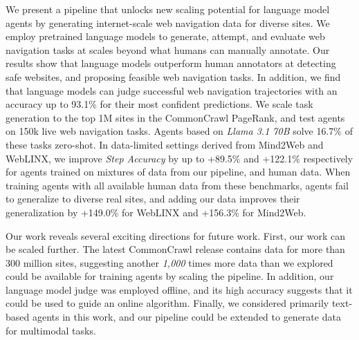 We present a pipeline that unlocks new scaling potential for language model agents by generating internet-scale web navigation data for diverse sites. We employ pretrained language models to generate, attempt, and evaluate web navigation tasks at scales beyond what humans can manually annotate. Our results show that language models outperform human annotators at detecting safe websites, and proposing feasible web navigation tasks. In addition, we find that language models can judge successful web navigation trajectories with an accuracy up to 93.1\% for their most confident predictions. We scale task generation to the top 1M sites in the CommonCrawl PageRank, and test agents on 150k live web navigation tasks. Agents based on \textit{Llama 3.1 70B} solve 16.7\% of these tasks zero-shot. In data-limited settings derived from Mind2Web and WebLINX, we improve \textit{Step Accuracy} by up to +89.5\% and +122.1\% respectively for agents trained on mixtures of data from our pipeline, and human data. When training agents with all available human data from these benchmarks, agents fail to generalize to diverse real sites, and adding our data improves their generalization by +149.0\% for WebLINX and +156.3\% for Mind2Web. 

Our work reveals several exciting directions for future work. First, our work can be scaled further. The latest CommonCrawl release contains data for more than 300 million sites, suggesting another \textit{1,000} times more data than we explored could be available for training agents by scaling the pipeline. In addition, our language model judge was employed offline, and its high accuracy suggests that it could be used to guide an online algorithm. Finally, we considered primarily text-based agents in this work, and our pipeline could be extended to generate data for multimodal tasks. 